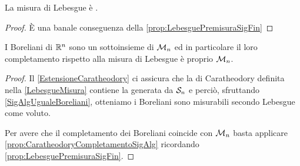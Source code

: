 \begin{remark}\label{nota:LebesgueSigFin}
	La misura di Lebesgue è \sigfin{}.
\end{remark}
\begin{proof}
	È una banale conseguenza della \cref{prop:LebesguePremisuraSigFin}
\end{proof}


\begin{proposition}\label{prop:CompletamentoBoreliani}
	I Boreliani di $\R^n$ sono un sottoinsieme di $\M_n$ ed in particolare il loro completamento rispetto alla misura di Lebesgue è proprio $\M_n$.
\end{proposition}
\begin{proof}
	Il \cref{EstensioneCaratheodory} ci assicura che la \sigalg{} di Caratheodory definita nella \cref{LebesgueMisura} contiene la \sigalg{} generata da $\S_n$ e perciò, sfruttando \cref{SigAlgUgualeBoreliani}, otteniamo i Boreliani sono misurabili secondo Lebesgue come voluto.
	
	Per avere che il completamento dei Boreliani coincide con $\M_n$ basta applicare \cref{prop:CaratheodoryCompletamentoSigAlg} ricordando \cref{prop:LebesguePremisuraSigFin}.
\end{proof}

